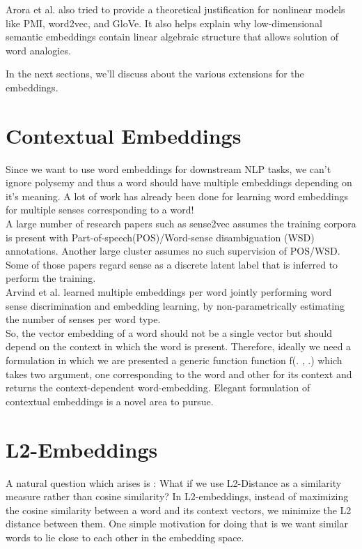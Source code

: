 \documentclass[12pt]{article}
\begin{document}
Arora et al.\cite{DBLP:journals/corr/AroraLLMR15} also tried to provide a theoretical justification for nonlinear models like PMI, word2vec, and GloVe. It also helps explain why low-dimensional semantic embeddings contain linear algebraic structure that allows solution of word analogies.\newline

In the next sections, we'll discuss about the various extensions for the embeddings.

\section{Contextual Embeddings}
Since we want to use word embeddings for downstream NLP tasks, we can't ignore polysemy and thus a word should have multiple embeddings depending on it's meaning. A lot of work has already been done for learning word embeddings for multiple senses corresponding to a word!\\

A large number of research papers such as sense2vec\cite{DBLP:journals/corr/TraskML15} assumes the training corpora is present with Part-of-speech(POS)/Word-sense disambiguation (WSD) annotations. Another large cluster assumes no such supervision of POS/WSD. Some of those papers regard sense as a discrete latent label that is inferred to perform the training.\\

Arvind et al.\cite{DBLP:journals/corr/NeelakantanSPM15} learned multiple embeddings per word jointly performing word sense discrimination and embedding learning, by non-parametrically estimating the number of senses per word type.\\

So, the vector embedding of a word should not be a single vector but should depend on the context in which the word is present. Therefore, ideally we need a formulation in which we are presented a generic function function 
f(. , .) which takes two argument, one corresponding to the word and other for its context and returns the context-dependent word-embedding. Elegant formulation of contextual embeddings is a novel area to pursue.\\

\section{L2-Embeddings}
A natural question which arises is : What if we use L2-Distance as a similarity measure rather than cosine similarity? In L2-embeddings, instead of maximizing the cosine similarity between a word and its context vectors, we minimize the L2 distance between them. One simple motivation for doing that is we want similar words to lie close to each other in the embedding space.\\ 
\end{document}
